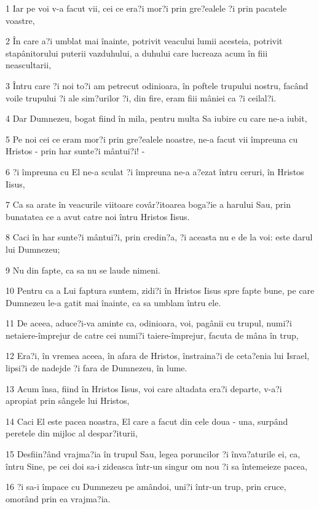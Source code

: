 \par 1 Iar pe voi v-a facut vii, cei ce era?i mor?i prin gre?ealele ?i prin pacatele voastre,
\par 2 În care a?i umblat mai înainte, potrivit veacului lumii acesteia, potrivit stapânitorului puterii vazduhului, a duhului care lucreaza acum în fiii neascultarii,
\par 3 Întru care ?i noi to?i am petrecut odinioara, în poftele trupului nostru, facând voile trupului ?i ale sim?urilor ?i, din fire, eram fiii mâniei ca ?i ceilal?i.
\par 4 Dar Dumnezeu, bogat fiind în mila, pentru multa Sa iubire cu care ne-a iubit,
\par 5 Pe noi cei ce eram mor?i prin gre?ealele noastre, ne-a facut vii împreuna cu Hristos - prin har sunte?i mântui?i! -
\par 6 ?i împreuna cu El ne-a sculat ?i împreuna ne-a a?ezat întru ceruri, în Hristos Iisus,
\par 7 Ca sa arate în veacurile viitoare covâr?itoarea boga?ie a harului Sau, prin bunatatea ce a avut catre noi întru Hristos Iisus.
\par 8 Caci în har sunte?i mântui?i, prin credin?a, ?i aceasta nu e de la voi: este darul lui Dumnezeu;
\par 9 Nu din fapte, ca sa nu se laude nimeni.
\par 10 Pentru ca a Lui faptura suntem, zidi?i în Hristos Iisus spre fapte bune, pe care Dumnezeu le-a gatit mai înainte, ca sa umblam întru ele.
\par 11 De aceea, aduce?i-va aminte ca, odinioara, voi, pagânii cu trupul, numi?i netaiere-împrejur de catre cei numi?i taiere-împrejur, facuta de mâna în trup,
\par 12 Era?i, în vremea aceea, în afara de Hristos, înstraina?i de ceta?enia lui Israel, lipsi?i de nadejde ?i fara de Dumnezeu, în lume.
\par 13 Acum însa, fiind în Hristos Iisus, voi care altadata era?i departe, v-a?i apropiat prin sângele lui Hristos,
\par 14 Caci El este pacea noastra, El care a facut din cele doua - una, surpând peretele din mijloc al despar?iturii,
\par 15 Desfiin?ând vrajma?ia în trupul Sau, legea poruncilor ?i înva?aturile ei, ca, întru Sine, pe cei doi sa-i zideasca într-un singur om nou ?i sa întemeieze pacea,
\par 16 ?i sa-i împace cu Dumnezeu pe amândoi, uni?i într-un trup, prin cruce, omorând prin ea vrajma?ia.
